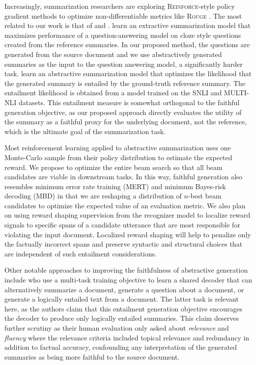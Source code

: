 Increasingly, summarization researchers are exploring
 \textsc{Reinforce}-style
policy gradient methods to optimize non-differentiable metrics like 
\textsc{Rouge} \citep{paulus2017deep,arumae2018reinforced,kryscinski2018improving,narayan2018ranking,pasunuru2018multi}.
The most related to our work is that of \cite{arumae2018reinforced} 
and \cite{pasunuru2018multi}.
\cite{arumae2018reinforced} 
learn an extractive summarization model that maximizes
performance of a question-answering model on cloze style questions created
from the reference summaries. In our proposed method, the questions are 
generated from the source document and we use abstractively generated 
summaries as
the input to the question answering model, a significantly harder task.
\cite{pasunuru2018multi} learn an abstractive summarization model that
optimizes the likelihood that the generated summary is entailed by the 
ground-truth reference summary. The entailment likelihood is obtained from a
model trained on the SNLI \citep{bowman2015large} and MULTI-NLI 
\citep{williams2018broad} datasets.
This entailment measure is somewhat orthogonal to the faithful generation 
objective, as our proposed
approach directly evaluates the utility of the summary as a faithful proxy
for the underlying document, not the reference, which is the ultimate goal of the 
summarization task.


Most reinforcement learning applied to abstractive summarization uses
one Monte-Carlo sample from their policy distribution to estimate the 
expected reward. We propose to optimize
the entire beam search so that all beam candidates are viable in downstream
tasks. In this way, faithful generation also resembles 
minimum error rate training (MERT) \citep{och2003minimum} 
and minimum Bayes-risk decoding (MBD)
\citep{kumar2004minimum} in that we are reshaping a distribution of $n$-best
beam candidates to optimize the expected value of an evaluation metric.
We also plan on using reward shaping supervision from the recognizer
model to localize reward signals \citep{mnih2014neural} to specific spans of 
a candidate utterance
that are most responsible for violating the input document. Localized
reward shaping will help to penalize only the factually incorrect spans
and preserve syntactic and structural choices that are independent of 
such entailment considerations.


Other notable approaches to improving the faithfulness of abstractive 
generation include \cite{guo2018soft} who use a multi-task training objective 
to learn a shared decoder that can alternatively summarize a document,
generate a question about a document, or generate a logically entailed text 
from a document.
The latter task is relevant here, as the authors claim that this entailment
generation objective encourages the decoder to produce only logically entailed
summaries. This claim deserves further scrutiny as their human 
evaluation only asked about \textit{relevance} and \textit{fluency} where
the relevance criteria included topical relevance and redundancy in addition
to factual accuracy, confounding any interpretation of the generated summaries
as being more faithful to the source document.

